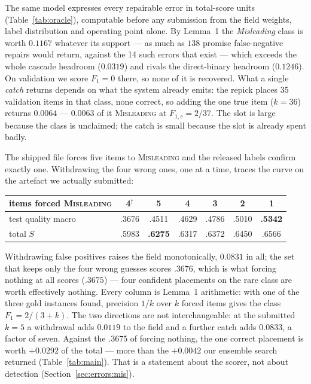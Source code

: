 The same model expresses every repairable error in total-score units (Table~\ref{tab:oracle}),
computable before any submission from the field weights, label distribution and operating point
alone. By Lemma~1 the \textit{Misleading} class is worth $0.1167$ whatever its support --- as much
as $138$ promise false-negative repairs would return, against the 14 such errors that exist ---
which exceeds the whole cascade headroom ($0.0319$) and rivals the direct-binary headroom
($0.1246$). On validation we score $F_1{=}0$ there, so none of it is recovered. What a single
\emph{catch} returns depends on what the system already emits: the repick places 35 validation
items in that class, none correct, so adding the one true item ($k{=}36$) returns $0.0064$ ---
$0.0063$ of it \textsc{Misleading} at $F_{1,c}=2/37$. The slot is large because the
class is unclaimed; the catch is small because the slot is already spent badly.

 The shipped file forces five items
to \textsc{Misleading} and the released labels confirm exactly one. Withdrawing the four wrong
ones, one at a time, traces the curve on the artefact we actually submitted:

{\centering\footnotesize
\begin{tabular}{@{}lcccccc@{}}
\toprule
items forced \textsc{Misleading} & 4$^{\dagger}$ & 5 & 4 & 3 & 2 & 1 \\
\midrule
test quality macro & .3676 & .4511 & .4629 & .4786 & .5010 & \textbf{.5342} \\
total $S$ & .5983 & \textbf{.6275} & .6317 & .6372 & .6450 & .6566 \\
\bottomrule
\end{tabular}\par}

Withdrawing false positives raises the field monotonically, $0.0831$ in all; the set that keeps
only the four wrong guesses scores $.3676$, which is what forcing nothing at all scores ($.3675$)
--- four confident placements on the rare class are worth effectively nothing. Every column is
Lemma~1 arithmetic: with one of the three gold instances found, precision $1/k$ over $k$ forced
items gives the class $F_1 = 2/(3+k)$. The two directions are not interchangeable: at the
submitted $k{=}5$ a withdrawal adds $0.0119$ to the field and a further catch adds $0.0833$, a
factor of seven. Against the $.3675$ of forcing nothing, the one correct placement is worth
$+0.0292$ of the total --- more than the $+0.0042$ our ensemble search returned
(Table~\ref{tab:main}). That
is a statement about the scorer, not about detection (Section~\ref{sec:errors:mis}).

